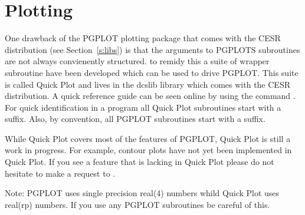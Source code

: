 \chapter{Plotting}
\label{c:plot}

One drawback of the PGPLOT plotting package that comes with the CESR distribution (see
Section~\ref{s:libs}) is that the arguments to PGPLOTS subroutines are not always
convienently structured. to remidy this a suite of wrapper subroutine have been developed
which can be used to drive PGPLOT. This suite is called Quick Plot and lives in the dcslib
library which comes with the CESR distribution. A quick reference guide can be seen online
by using the command . For quick identification in a program
all Quick Plot subroutines start with a  suffix. Also, by convention, all PGPLOT
subroutines start with a  suffix. 

While Quick Plot covers most of the features of PGPLOT, Quick Plot is still a work in progress. 
For example, contour plots have not yet been implemented in Quick Plot. If you see a feature
that is lacking in Quick Plot please do not hesitate to make a request to .

Note: PGPLOT uses single precision real(4) numbers whild Quick Plot uses real(rp) numbers.
If you use any PGPLOT subroutines be careful of this.


